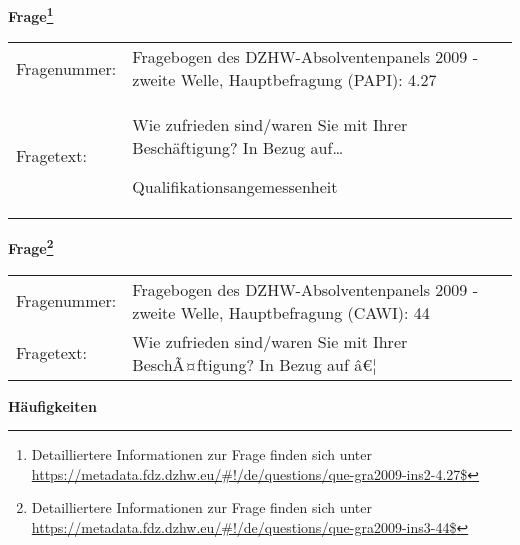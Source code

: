 				\vspace*{0.5cm}
                \noindent\textbf{Frage\footnote{Detailliertere Informationen zur Frage finden sich unter
		              \url{https://metadata.fdz.dzhw.eu/\#!/de/questions/que-gra2009-ins2-4.27$}}}\\
				\begin{tabularx}{\hsize}{@{}lX}
					Fragenummer: &
					  Fragebogen des DZHW-Absolventenpanels 2009 - zweite Welle, Hauptbefragung (PAPI):
					  4.27
 \\
					Fragetext: & Wie zufrieden sind/waren Sie mit Ihrer Beschäftigung? In Bezug auf…\par  Qualifikationsangemessenheit \\
				\end{tabularx}
				\vspace*{0.5cm}
                \noindent\textbf{Frage\footnote{Detailliertere Informationen zur Frage finden sich unter
		              \url{https://metadata.fdz.dzhw.eu/\#!/de/questions/que-gra2009-ins3-44$}}}\\
				\begin{tabularx}{\hsize}{@{}lX}
					Fragenummer: &
					  Fragebogen des DZHW-Absolventenpanels 2009 - zweite Welle, Hauptbefragung (CAWI):
					  44
 \\
					Fragetext: & Wie zufrieden sind/waren Sie mit Ihrer BeschÃ¤ftigung? In Bezug auf â€¦ \\
				\end{tabularx}





        		\vspace*{0.5cm}
                \noindent\textbf{Häufigkeiten}

